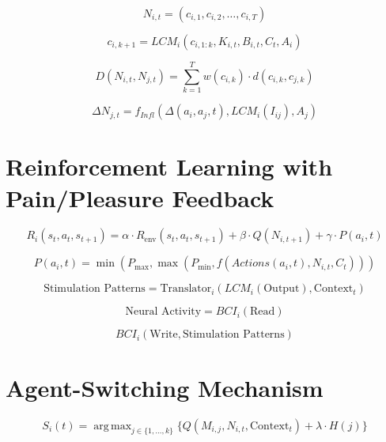 \documentclass[12pt, a4paper]{article}
\DeclareMathOperator*{\argmax}{arg\,max}
\begin{document}
\begin{equation}
N_{i,t} = (c_{i,1}, c_{i,2}, \dots, c_{i,T})
\end{equation}

\begin{equation}
c_{i,k+1} = LCM_i(c_{i,1:k}, K_{i,t}, B_{i,t}, C_t, A_i)
\end{equation}

\begin{equation}
D(N_{i,t}, N_{j,t}) = \sum_{k=1}^T w(c_{i,k}) \cdot d(c_{i,k}, c_{j,k})
\end{equation}

\begin{equation}
\Delta N_{j,t} = f_{Infl}(\Delta(a_i, a_j, t), LCM_i(I_{ij}), A_j)
\end{equation}

\section{Reinforcement Learning with Pain/Pleasure Feedback}

\begin{equation}
R_i(s_t, a_t, s_{t+1}) = \alpha \cdot R_{\text{env}}(s_t, a_t, s_{t+1}) + \beta \cdot Q(N_{i,t+1}) + \gamma \cdot P(a_i, t)
\end{equation}

\begin{equation}
P(a_i, t) = \min(P_{\text{max}}, \max(P_{\text{min}}, f(Actions(a_i, t), N_{i,t}, C_t)))
\end{equation}

\begin{equation}
\text{Stimulation Patterns} = \text{Translator}_i(LCM_i(\text{Output}), \text{Context}_t)
\end{equation}

\begin{equation}
\text{Neural Activity} = BCI_i(\text{Read})
\end{equation}

\begin{equation}
BCI_i(\text{Write}, \text{Stimulation Patterns})
\end{equation}

\section{Agent-Switching Mechanism}

\begin{equation}
S_i(t) = \argmax_{j \in \{1, \dots, k\}} \{Q(M_{i,j}, N_{i,t}, \text{Context}_t) + \lambda \cdot H(j)\}
\end{equation}
\end{document}
